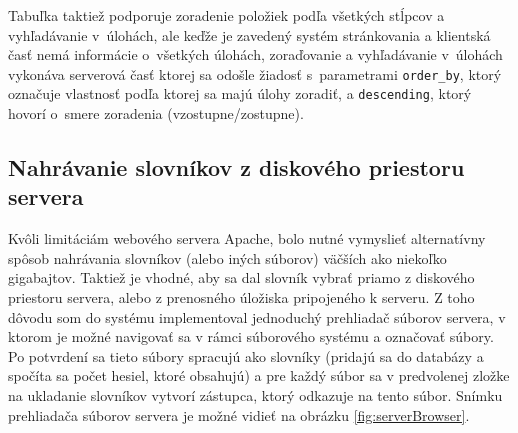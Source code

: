\documentclass[slovak]{fitthesis}
\begin{document}
Tabuľka taktiež podporuje zoradenie položiek podľa všetkých stĺpcov a vyhľadávanie v~úlohách, ale keďže je zavedený systém stránkovania a klientská časť nemá informácie o~všetkých úlohách, zoraďovanie a vyhľadávanie v~úlohách vykonáva serverová časť ktorej sa odošle žiadosť s~parametrami \texttt{order\_by}, ktorý označuje vlastnosť podľa ktorej sa majú úlohy zoradiť, a \texttt{descending}, ktorý hovorí o~smere zoradenia (vzostupne/zostupne).


\subsection{Nahrávanie slovníkov z diskového priestoru servera}
Kvôli limitáciám webového servera Apache, bolo nutné vymyslieť alternatívny spôsob nahrávania slovníkov (alebo iných súborov) väčších ako niekoľko gigabajtov. Taktiež je vhodné, aby sa dal slovník vybrať priamo z diskového priestoru servera, alebo z prenosného úložiska pripojeného k serveru. Z toho dôvodu som do systému implementoval jednoduchý prehliadač súborov servera, v ktorom je možné navigovať sa v rámci súborového systému a označovať súbory. Po potvrdení sa tieto súbory spracujú ako slovníky (pridajú sa do databázy a spočíta sa počet hesiel, ktoré obsahujú) a pre každý súbor sa v predvolenej zložke na ukladanie slovníkov vytvorí zástupca, ktorý odkazuje na tento súbor. Snímku prehliadača súborov servera je možné vidieť na obrázku \ref{fig:serverBrowser}.
\end{document}
